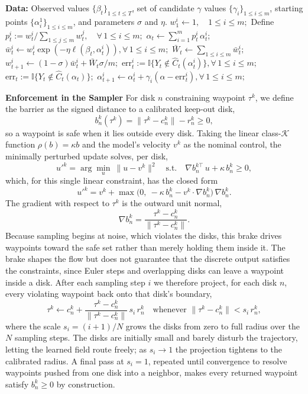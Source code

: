 \documentclass[letterpaper]{article} %
\begin{document}
\begin{algorithm}[t]
\caption{Deterministic Mean DtACI}
\label{eq:determinisitc-mean_dtaci}
\begin{algorithmic}[1]
\STATE \textbf{Data:} Observed values $\{\beta_t\}_{1\le t\le T}$, set of candidate $\gamma$ values $\{\gamma_i\}_{1\le i\le m}$, starting points $\{\alpha_i^1\}_{1\le i\le m}$, and parameters $\sigma$ and $\eta$.
\STATE $w_1^i \leftarrow 1,\quad 1\le i\le m;$ 
\STATE Define $p_t^i := w_t^i/{\sum_{1\le j\le m} w_t^j},\quad \forall\,1\le i\le m;$ 
\STATE $\alpha_t \leftarrow \sum_{i=1}^{m} p_t^i \, \alpha_t^i$;
\STATE $\bar{w}_t^i \leftarrow w_t^i \exp\!\left(-\eta\ell(\beta_t,\alpha_t^i)\right), \forall\,1\le i\le m;$ 
\STATE $\bar{W}_t \leftarrow \sum_{1\le i\le m} \bar{w}_t^i;$ 
\STATE $w_{t+1}^i \leftarrow (1-\sigma)\bar{w}_t^i+\bar{W}_t\sigma/m;$ 
\STATE $\mathrm{err}_t^i := \mathbb{I}{\{Y_t\notin \hat{C}_t(\alpha_t^i)}\}, \forall\,1\le i\le m;$ 
\STATE $\mathrm{err}_t := \mathbb{I}{\{Y_t\notin \hat{C}_t(\alpha_t)}\};$ 
\STATE $\alpha_{t+1}^i \leftarrow \alpha_t^i + \gamma_i(\alpha-\mathrm{err}_t^i),\forall\,1\le i\le m;$ 
\ENDFOR
\end{algorithmic}
\end{algorithm}

\textbf{Enforcement in the Sampler}
For disk \(n\) constraining waypoint \(\tau^k\), we define the barrier as the signed distance to a calibrated keep-out disk,
\[
b^k_n(\tau^k) = \lVert \tau^k - c^k_n \rVert - r^k_n \ge 0,
\]
so a waypoint is safe when it lies outside every disk. Taking the linear class-\(\mathcal{K}\) function \(\rho(b) = \kappa b\) and the model's velocity \(v^k\) as the nominal control, the minimally perturbed update solves, per disk,
\[
u'^k = \arg\min_{u}\ \lVert u - v^k \rVert^2
\quad \text{s.t.} \quad
\nabla b^{k\top}_n\, u + \kappa\, b^k_n \ge 0 ,
\]
which, for this single linear constraint, has the closed form
\[
u'^k = v^k + \max\!\big(0,\ -\kappa\, b^k_n - v^k \cdot \nabla b^k_n \big)\,\nabla b^k_n .
\]
The gradient with respect to \(\tau^k\) is the outward unit normal,
\[
\nabla b^k_n = \frac{\tau^k - c^k_n}{\lVert \tau^k - c^k_n \rVert}.
\]
Because sampling begins at noise, which violates the disks, this brake drives waypoints toward the safe set rather than merely holding them inside it. The brake shapes the flow but does not guarantee that the discrete output satisfies the constraints, since Euler steps and overlapping disks can leave a waypoint inside a disk. After each sampling step \(i\) we therefore project, for each disk \(n\), every violating waypoint back onto that disk's boundary,
\[
\tau^k \leftarrow c^k_n + \frac{\tau^k - c^k_n}{\lVert \tau^k - c^k_n \rVert}\, s_i\, r^k_n
\quad \text{whenever } \lVert \tau^k - c^k_n \rVert < s_i\, r^k_n ,
\]
where the scale \(s_i = (i+1)/N\) grows the disks from zero to full radius over the
\(N\) sampling steps. The disks are initially small and barely disturb the trajectory, letting the learned field route freely; as \(s_i \to 1\) the projection tightens to
the calibrated radius. A final pass at \(s_i = 1\), repeated until convergence to resolve waypoints pushed from one disk into a neighbor, makes every returned waypoint satisfy \(b^k_n \ge 0\) by construction.
\end{document}
